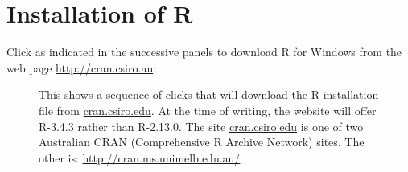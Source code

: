 





\section{Installation of R}

Click as indicated in the successive panels to download R for
Windows from the web page \url{http://cran.csiro.au}:
\vspace*{-3pt}

\begin{figure}
\vspace*{2pt}

\vspace*{2pt}

\caption{This shows a sequence of clicks that will download
  the R installation file from \url{cran.csiro.edu}. At the time of writing,
  the website will offer R-3.4.3 rather than R-2.13.0. The site
  \url{cran.csiro.edu} is one of two Australian CRAN (Comprehensive R Archive
  Network) sites. The other is:
  \url{http://cran.ms.unimelb.edu.au/}}
\end{figure}

